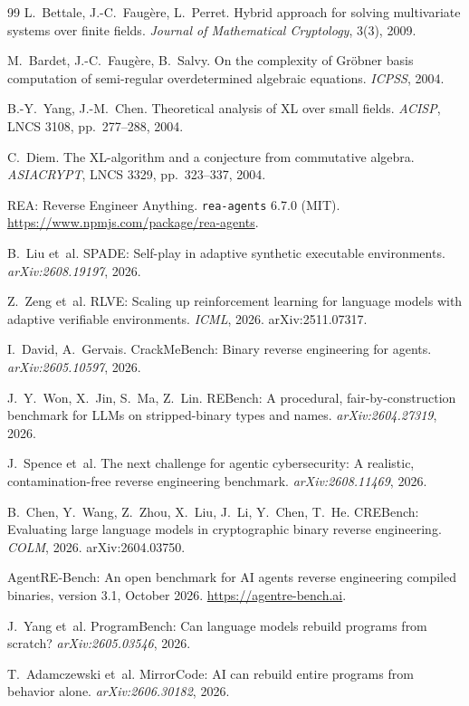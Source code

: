 \documentclass[10pt]{article}
\newcommand{\code}[1]{\texttt{#1}}
\begin{document}
\begin{thebibliography}{99}
 L.~Bettale, J.-C.~Faug\`ere, L.~Perret. Hybrid approach for solving multivariate
systems over finite fields. \emph{Journal of Mathematical Cryptology}, 3(3), 2009.

 M.~Bardet, J.-C.~Faug\`ere, B.~Salvy. On the complexity of Gr\"obner basis
computation of semi-regular overdetermined algebraic equations. \emph{ICPSS}, 2004.

 B.-Y.~Yang, J.-M.~Chen. Theoretical analysis of XL over small fields.
\emph{ACISP}, LNCS 3108, pp.~277--288, 2004.

 C.~Diem. The XL-algorithm and a conjecture from commutative algebra.
\emph{ASIACRYPT}, LNCS 3329, pp.~323--337, 2004.

 REA: Reverse Engineer Anything. \code{rea-agents} 6.7.0 (MIT).
\url{https://www.npmjs.com/package/rea-agents}.

 B.~Liu et~al. SPADE: Self-play in adaptive synthetic executable environments.
\emph{arXiv:2608.19197}, 2026.

 Z.~Zeng et~al. RLVE: Scaling up reinforcement learning for language models with
adaptive verifiable environments. \emph{ICML}, 2026. arXiv:2511.07317.

 I.~David, A.~Gervais. CrackMeBench: Binary reverse engineering for agents.
\emph{arXiv:2605.10597}, 2026.

 J.~Y.~Won, X.~Jin, S.~Ma, Z.~Lin. REBench: A procedural, fair-by-construction
benchmark for LLMs on stripped-binary types and names. \emph{arXiv:2604.27319}, 2026.

 J.~Spence et~al. The next challenge for agentic cybersecurity: A realistic,
contamination-free reverse engineering benchmark. \emph{arXiv:2608.11469}, 2026.

 B.~Chen, Y.~Wang, Z.~Zhou, X.~Liu, J.~Li, Y.~Chen, T.~He. CREBench: Evaluating
large language models in cryptographic binary reverse engineering. \emph{COLM}, 2026.
arXiv:2604.03750.

 AgentRE-Bench: An open benchmark for AI agents reverse engineering compiled
binaries, version 3.1, October 2026. \url{https://agentre-bench.ai}.

 J.~Yang et~al. ProgramBench: Can language models rebuild programs from
scratch? \emph{arXiv:2605.03546}, 2026.

 T.~Adamczewski et~al. MirrorCode: AI can rebuild entire programs from
behavior alone. \emph{arXiv:2606.30182}, 2026.


\end{thebibliography}
\end{document}
